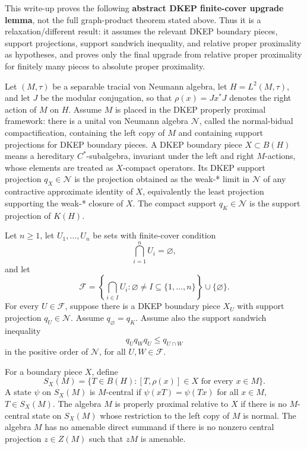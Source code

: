 \documentclass[12pt]{article}
\begin{document}
This write-up proves the following \textbf{abstract DKEP finite-cover upgrade lemma}, not the full graph-product theorem stated above. Thus it is a relaxation/different result: it assumes the relevant DKEP boundary pieces, support projections, support sandwich inequality, and relative proper proximality as hypotheses, and proves only the final upgrade from relative proper proximality for finitely many pieces to absolute proper proximality.

Let \((M,\tau)\) be a separable tracial von Neumann algebra, let \(H=L^2(M,\tau)\), and let \(J\) be the modular conjugation, so that \(\rho(x)=Jx^*J\) denotes the right action of \(M\) on \(H\). Assume \(M\) is placed in the DKEP properly proximal framework: there is a unital von Neumann algebra \(\mathcal N\), called the normal-bidual compactification, containing the left copy of \(M\) and containing support projections for DKEP boundary pieces. A DKEP boundary piece \(X\subset B(H)\) means a hereditary \(C^*\)-subalgebra, invariant under the left and right \(M\)-actions, whose elements are treated as \(X\)-compact operators. Its DKEP support projection \(q_X\in\mathcal N\) is the projection obtained as the weak-* limit in \(\mathcal N\) of any contractive approximate identity of \(X\), equivalently the least projection supporting the weak-* closure of \(X\). The compact support \(q_K\in\mathcal N\) is the support projection of \(K(H)\).

Let \(n\ge 1\), let \(U_1,\dots,U_n\) be sets with finite-cover condition
\[
\bigcap_{i=1}^n U_i=\varnothing,
\]
and let
\[
\mathcal F=\left\{\bigcap_{i\in I}U_i:\varnothing\ne I\subseteq\{1,\dots,n\}\right\}\cup\{\varnothing\}.
\]
For every \(U\in\mathcal F\), suppose there is a DKEP boundary piece \(X_U\) with support projection \(q_U\in\mathcal N\). Assume \(q_{\varnothing}=q_K\). Assume also the support sandwich inequality
\[
q_Uq_Wq_U\le q_{U\cap W}
\]
in the positive order of \(\mathcal N\), for all \(U,W\in\mathcal F\).

For a boundary piece \(X\), define
\[
S_X(M)=\{T\in B(H):[T,\rho(x)]\in X\text{ for every }x\in M\}.
\]
A state \(\psi\) on \(S_X(M)\) is \(M\)-central if \(\psi(xT)=\psi(Tx)\) for all \(x\in M\), \(T\in S_X(M)\). The algebra \(M\) is properly proximal relative to \(X\) if there is no \(M\)-central state on \(S_X(M)\) whose restriction to the left copy of \(M\) is normal. The algebra \(M\) has no amenable direct summand if there is no nonzero central projection \(z\in Z(M)\) such that \(zM\) is amenable.
\end{document}
